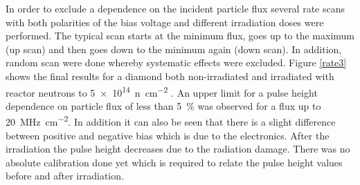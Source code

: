 
In order to exclude a dependence on the incident particle flux several rate scans with both polarities of the bias voltage and different irradiation doses were performed. The typical scan starts at the minimum flux, goes up to the maximum (up scan) and then goes down to the minimum again (down scan). In addition, random scan were done whereby systematic effects were excluded. Figure \vref{rate3} shows the final results for a \pcvd diamond both non-irradiated and irradiated with reactor neutrons to \SI{5e14}{n\per \centi\meter^2} . An upper limit for a pulse height dependence on particle flux of less than \SI{5}{\%} was observed for a flux up to \SI{20}{\mega\hertz\per cm^2}. In addition it can also be seen that there is a slight difference between positive and negative bias which is due to the electronics. After the irradiation the pulse height decreases due to the radiation damage. There was no absolute calibration done yet which is required to relate the pulse height values before and after irradiation.

